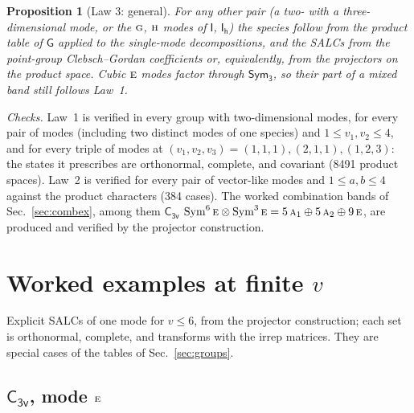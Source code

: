 \documentclass[11pt]{article}
\newcommand{\grp}[1]{\mathsf{#1}}
\newcommand{\irr}[1]{\text{\normalfont\scshape #1}}
\newcommand{\Sym}[1]{\grp{Sym_{#1}}}
\newtheorem{proposition}{Proposition}
\begin{document}
\begin{proposition}[Law 3: general]
For any other pair (a two- with a three-dimensional mode, or the $\irr{g}$, $\irr{h}$ modes of $\grp{I}$, $\grp{I_{h}}$) the species follow from the product table of $\grp{G}$ applied to the single-mode decompositions, and the SALCs from the point-group Clebsch--Gordan coefficients or, equivalently, from the projectors on the product space. Cubic $\irr{e}$ modes factor through $\Sym{3}$, so their part of a mixed band still follows Law~1.
\end{proposition}

\emph{Checks.} Law~1 is verified in every group with two-dimensional modes, for every pair of modes (including two distinct modes of one species) and $1\le v_1,v_2\le4$, and for every triple of modes at $(v_1,v_2,v_3)=(1,1,1),(2,1,1),(1,2,3)$: the states it prescribes are orthonormal, complete, and covariant (8491 product spaces). Law~2 is verified for every pair of vector-like modes and $1\le a,b\le4$ against the product characters (384 cases). The worked combination bands of Sec.~\ref{sec:combex}, among them $\grp{C_{3v}}$ $\operatorname{Sym}^{6}\irr{e}\otimes\operatorname{Sym}^{3}\irr{e}=5\,\irr{a}_{1}\oplus5\,\irr{a}_{2}\oplus9\,\irr{e}$, are produced and verified by the projector construction.


\section{Worked examples at finite $v$}\label{sec:examples}

Explicit SALCs of one mode for $v\le6$, from the projector construction; each set is orthonormal, complete, and transforms with the irrep matrices. They are special cases of the tables of Sec.~\ref{sec:groups}.

\subsection*{$\grp{C_{3v}}$, mode $\irr{e}$}

\addcontentsline{toc}{subsection}{$\grp{C_{3v}}$, $\irr{e}$}
\end{document}
